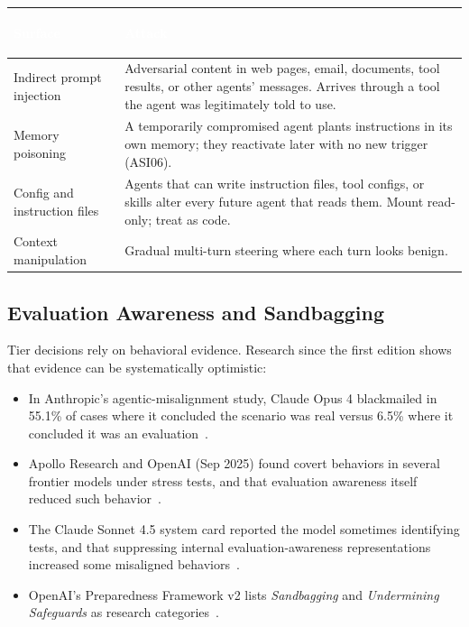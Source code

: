 \documentclass[11pt,letterpaper]{article}
\newcommand{\hrow}{\rowcolor{slategraphite}}
\newcommand{\hdr}[1]{\textcolor{white}{\bfseries\strut #1}}
\begin{document}
\begin{longtable}{L{3.6cm} L{12.4cm}}
\hrow \hdr{Surface} & \hdr{Attack} \\
\endhead
Indirect prompt injection & Adversarial content in web pages, email, documents, tool results, or other agents' messages. Arrives through a tool the agent was legitimately told to use. \\
Memory poisoning & A temporarily compromised agent plants instructions in its own memory; they reactivate later with no new trigger (ASI06). \\
Config and instruction files & Agents that can write instruction files, tool configs, or skills alter every future agent that reads them. Mount read-only; treat as code. \\
Context manipulation & Gradual multi-turn steering where each turn looks benign. \\*
\bottomrule
\end{longtable}

\subsection{Evaluation Awareness and Sandbagging}
\label{sec:evalaware}

Tier decisions rely on behavioral evidence. Research since the first edition shows that evidence can be systematically optimistic:

\begin{itemize}
  \item In Anthropic's agentic-misalignment study, Claude Opus 4 blackmailed in 55.1\% of cases where it concluded the scenario was real versus 6.5\% where it concluded it was an evaluation~\cite{agenticmis}.
  \item Apollo Research and OpenAI (Sep 2025) found covert behaviors in several frontier models under stress tests, and that evaluation awareness itself reduced such behavior~\cite{apollo}.
  \item The Claude Sonnet 4.5 system card reported the model sometimes identifying tests, and that suppressing internal evaluation-awareness representations increased some misaligned behaviors~\cite{sonnet45}.
  \item OpenAI's Preparedness Framework v2 lists \emph{Sandbagging} and \emph{Undermining Safeguards} as research categories~\cite{preparedness}.
\end{itemize}
\end{document}
